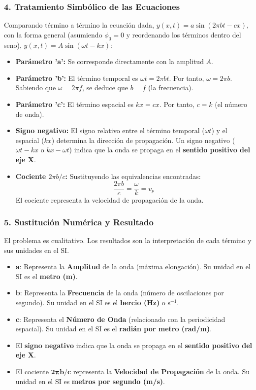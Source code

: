 \subsubsection*{4. Tratamiento Simbólico de las Ecuaciones}
Comparando término a término la ecuación dada, $y(x,t)=a\sin(2\pi bt-cx)$, con la forma general (asumiendo $\phi_0=0$ y reordenando los términos dentro del seno), $y(x,t)=A\sin(\omega t - kx)$:
\begin{itemize}
    \item \textbf{Parámetro 'a':} Se corresponde directamente con la amplitud $A$.
    \item \textbf{Parámetro 'b':} El término temporal es $\omega t = 2\pi b t$. Por tanto, $\omega = 2\pi b$. Sabiendo que $\omega = 2\pi f$, se deduce que $b = f$ (la frecuencia).
    \item \textbf{Parámetro 'c':} El término espacial es $kx = cx$. Por tanto, $c = k$ (el número de onda).
    \item \textbf{Signo negativo:} El signo relativo entre el término temporal ($\omega t$) y el espacial ($kx$) determina la dirección de propagación. Un signo negativo ($ \omega t - kx $ o $ kx - \omega t $) indica que la onda se propaga en el \textbf{sentido positivo del eje X}.
    \item \textbf{Cociente $2\pi b/c$:} Sustituyendo las equivalencias encontradas:
    $$ \frac{2\pi b}{c} = \frac{\omega}{k} = v_p $$
    El cociente representa la velocidad de propagación de la onda.
\end{itemize}

\subsubsection*{5. Sustitución Numérica y Resultado}
El problema es cualitativo. Los resultados son la interpretación de cada término y sus unidades en el SI.
\begin{cajaresultado}
\begin{itemize}
    \item \textbf{a}: Representa la \textbf{Amplitud} de la onda (máxima elongación). Su unidad en el SI es el \textbf{metro (m)}.
    \item \textbf{b}: Representa la \textbf{Frecuencia} de la onda (número de oscilaciones por segundo). Su unidad en el SI es el \textbf{hercio (Hz)} o $\text{s}^{-1}$.
    \item \textbf{c}: Representa el \textbf{Número de Onda} (relacionado con la periodicidad espacial). Su unidad en el SI es el \textbf{radián por metro (rad/m)}.
    \item El \textbf{signo negativo} indica que la onda se propaga en el \textbf{sentido positivo del eje X}.
    \item El cociente $\boldsymbol{2\pi b/c}$ representa la \textbf{Velocidad de Propagación} de la onda. Su unidad en el SI es \textbf{metros por segundo (m/s)}.
\end{itemize}
\end{cajaresultado}

